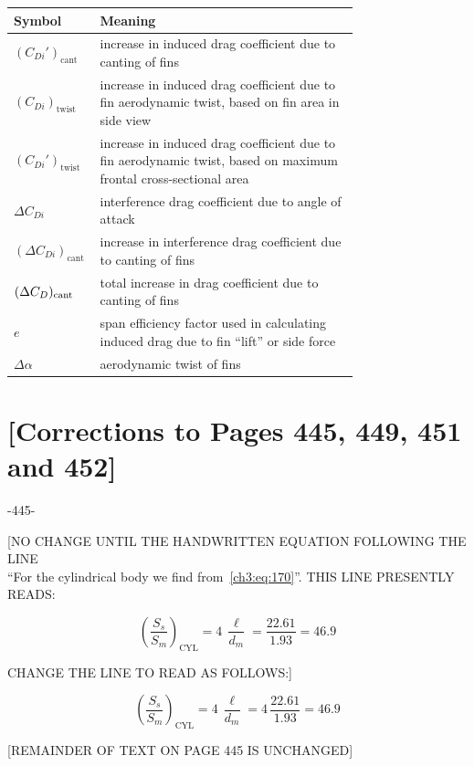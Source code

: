 \begin{center}
\begin{tabular}{@{}l >{\raggedright\arraybackslash}p{0.75\linewidth}@{}}
\toprule
\textbf{Symbol} & \textbf{Meaning}\\
\midrule
$(C_{Di}')_{\mathrm{cant}}$ & increase in induced drag coefficient due to canting of fins\\[0.8ex]
$(C_{Di})_{\mathrm{twist}}$ & increase in induced drag coefficient due to fin aerodynamic twist,
based on fin area in side view\\[0.8ex]
$(C_{Di}')_{\mathrm{twist}}$ & increase in induced drag coefficient due to fin aerodynamic twist,
based on maximum frontal cross-sectional area\\[0.8ex]
$\Delta C_{Di}$ & interference drag coefficient due to angle of attack\\[0.8ex]
$(\Delta C_{Di})_{\mathrm{cant}}$ & increase in interference drag coefficient due to canting of fins\\[0.8ex]
$(\Delta C_{D})_{\mathrm{cant}}$ & total increase in drag coefficient due to canting of fins\\[0.8ex]
$e$ & span efficiency factor used in calculating induced drag due to fin ``lift'' or side force\\[0.8ex]
$\Delta\alpha$ & aerodynamic twist of fins\\
\bottomrule
\end{tabular}
\end{center}

\chapter{[Corrections to Pages 445, 449, 451 and 452]}\label{supp:ch3-445}

\begin{center}
-445-
\end{center}

\begin{center}
[NO CHANGE UNTIL THE HANDWRITTEN EQUATION FOLLOWING THE LINE\\
``For the cylindrical body we find from~\eqref{ch3:eq:170}''. THIS LINE PRESENTLY READS:
\end{center}
\begin{equation*}
\left(\frac{S_s}{S_m}\right)_{\mathrm{CYL}} = 4\,\frac{\ell}{d_m} = \frac{22.61}{1.93} = 46.9
\end{equation*}
\begin{center}
CHANGE THE LINE TO READ AS FOLLOWS:]
\end{center}
\begin{equation*}
\left(\frac{S_s}{S_m}\right)_{\mathrm{CYL}} = 4\,\frac{\ell}{d_m} = 4\,\frac{22.61}{1.93} = 46.9
\end{equation*}
\begin{center}
[REMAINDER OF TEXT ON PAGE 445 IS UNCHANGED]
\end{center}

